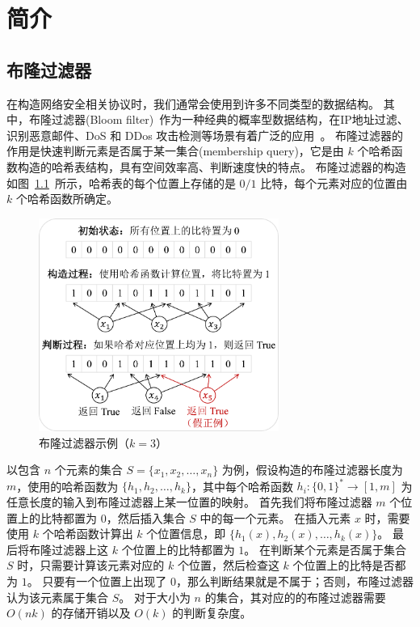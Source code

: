 
\chapter{简介}

\section{布隆过滤器}

在构造网络安全相关协议时，我们通常会使用到许多不同类型的数据结构。
其中，布隆过滤器(Bloom filter)~\cite{bloom1970space}作为一种经典的概率型数据结构，在IP地址过滤、识别恶意邮件、DoS 和 DDos 攻击检测等场景有着广泛的应用~\cite{geravand2013bloom}。
布隆过滤器的作用是快速判断元素是否属于某一集合(membership query)，它是由 $k$ 个哈希函数构造的哈希表结构，具有空间效率高、判断速度快的特点。
布隆过滤器的构造如图~\ref{fig:Bloom_example}~所示，哈希表的每个位置上存储的是 $0/1$ 比特，每个元素对应的位置由 $k$ 个哈希函数所确定。
\begin{figure}[ht]
  \centering
  \includegraphics[width=0.7\textwidth]{figures/Bloom_filter.pdf}
  \caption{布隆过滤器示例（$k=3$）}
  \label{fig:Bloom_example}
\end{figure}
以包含 $n$ 个元素的集合 $S=\{x_1, x_2, \dots, x_n\}$ 为例，假设构造的布隆过滤器长度为 $m$，使用的哈希函数为 $\{h_1, h_2, \dots, h_k\}$，其中每个哈希函数 $h_i:\{0,1\}^* \to [1, m]$ 为任意长度的输入到布隆过滤器上某一位置的映射。
首先我们将布隆过滤器 $m$ 个位置上的比特都置为 $0$，然后插入集合 $S$ 中的每一个元素。
在插入元素 $x$ 时，需要使用 $k$ 个哈希函数计算出 $k$ 个位置信息，即 $\{h_1(x),h_2(x),\dots, h_k(x)\}$。
最后将布隆过滤器上这 $k$ 个位置上的比特都置为 $1$。
在判断某个元素是否属于集合 $S$ 时，只需要计算该元素对应的 $k$ 个位置，然后检查这 $k$ 个位置上的比特是否都为 $1$。
只要有一个位置上出现了 $0$，那么判断结果就是不属于；否则，布隆过滤器认为该元素属于集合 $S$。
对于大小为 $n$ 的集合，其对应的的布隆过滤器需要 $O(nk)$ 的存储开销以及 $O(k)$ 的判断复杂度。

